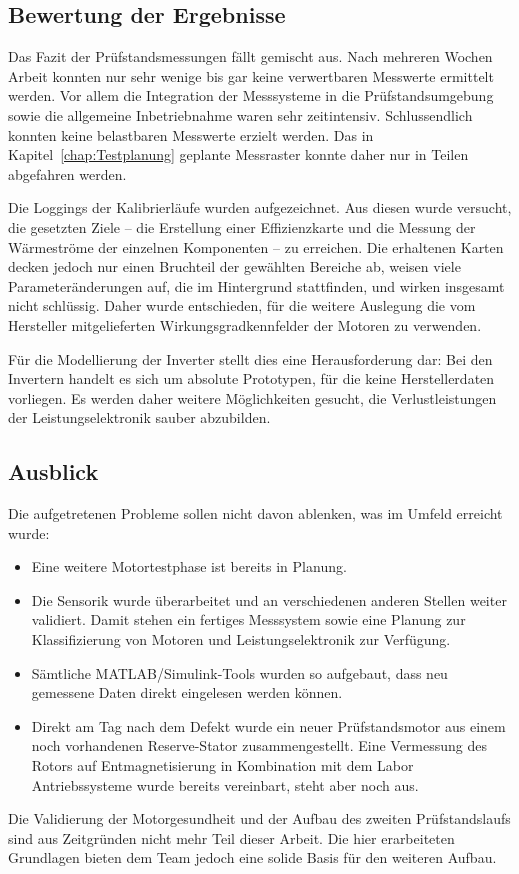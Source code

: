 \subsection{Bewertung der Ergebnisse}
\label{subsec:bewertung_pruefstand}

Das Fazit der Prüfstandsmessungen fällt gemischt aus. Nach mehreren Wochen Arbeit konnten nur sehr wenige bis gar keine verwertbaren Messwerte ermittelt werden. Vor allem die Integration der Messsysteme in die Prüfstandsumgebung sowie die allgemeine Inbetriebnahme waren sehr zeitintensiv. Schlussendlich konnten keine belastbaren Messwerte erzielt werden. Das in Kapitel~\ref{chap:Testplanung} geplante Messraster konnte daher nur in Teilen abgefahren werden.

Die Loggings der Kalibrierläufe wurden aufgezeichnet. Aus diesen wurde versucht, die gesetzten Ziele -- die Erstellung einer Effizienzkarte und die Messung der Wärmeströme der einzelnen Komponenten -- zu erreichen. Die erhaltenen Karten decken jedoch nur einen Bruchteil der gewählten Bereiche ab, weisen viele Parameteränderungen auf, die im Hintergrund stattfinden, und wirken insgesamt nicht schlüssig. Daher wurde entschieden, für die weitere Auslegung die vom Hersteller mitgelieferten Wirkungsgradkennfelder der Motoren zu verwenden.

Für die Modellierung der Inverter stellt dies eine Herausforderung dar: Bei den Invertern handelt es sich um absolute Prototypen, für die keine Herstellerdaten vorliegen. Es werden daher weitere Möglichkeiten gesucht, die Verlustleistungen der Leistungselektronik sauber abzubilden.

\subsection{Ausblick}
\label{subsec:ausblick_pruefstand}

Die aufgetretenen Probleme sollen nicht davon ablenken, was im Umfeld erreicht wurde:
\begin{itemize}
    \item Eine weitere Motortestphase ist bereits in Planung.
    \item Die Sensorik wurde überarbeitet und an verschiedenen anderen Stellen weiter validiert. Damit stehen ein fertiges Messsystem sowie eine Planung zur Klassifizierung von Motoren und Leistungselektronik zur Verfügung.
    \item Sämtliche MATLAB/Simulink-Tools wurden so aufgebaut, dass neu gemessene Daten direkt eingelesen werden können.
    \item Direkt am Tag nach dem Defekt wurde ein neuer Prüfstandsmotor aus einem noch vorhandenen Reserve-Stator zusammengestellt. Eine Vermessung des Rotors auf Entmagnetisierung in Kombination mit dem Labor Antriebssysteme wurde bereits vereinbart, steht aber noch aus.
\end{itemize}

Die Validierung der Motorgesundheit und der Aufbau des zweiten Prüfstandslaufs sind aus Zeitgründen nicht mehr Teil dieser Arbeit. Die hier erarbeiteten Grundlagen bieten dem Team jedoch eine solide Basis für den weiteren Aufbau.
